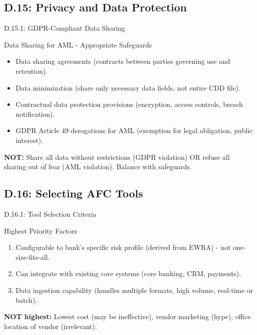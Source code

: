 \documentclass{beamer}
\begin{document}
	\subsection{D.15: Privacy and Data Protection}
	
	\begin{frame}{D.15.1: GDPR-Compliant Data Sharing}
		\begin{block}{Data Sharing for AML - Appropriate Safeguards}
			\begin{itemize}
				\item Data sharing agreements (contracts between parties governing use and retention).
				\item Data minimization (share only necessary data fields, not entire CDD file).
				\item Contractual data protection provisions (encryption, access controls, breach notification).
				\item GDPR Article 49 derogations for AML (exemption for legal obligation, public interest).
			\end{itemize}
		\end{block}
		\textbf{NOT:} Share all data without restrictions (GDPR violation) OR refuse all sharing out of fear (AML violation). Balance with safeguards.
	\end{frame}
	
	\subsection{D.16: Selecting AFC Tools}
	
	\begin{frame}{D.16.1: Tool Selection Criteria}
		\begin{block}{Highest Priority Factors}
			\begin{enumerate}
				\item Configurable to bank's specific risk profile (derived from EWRA) - not one-size-fits-all.
				\item Can integrate with existing core systems (core banking, CRM, payments).
				\item Data ingestion capability (handles multiple formats, high volume, real-time or batch).
			\end{enumerate}
		\end{block}
		\textbf{NOT highest:} Lowest cost (may be ineffective), vendor marketing (hype), office location of vendor (irrelevant).
	\end{frame}
	
\end{document}
